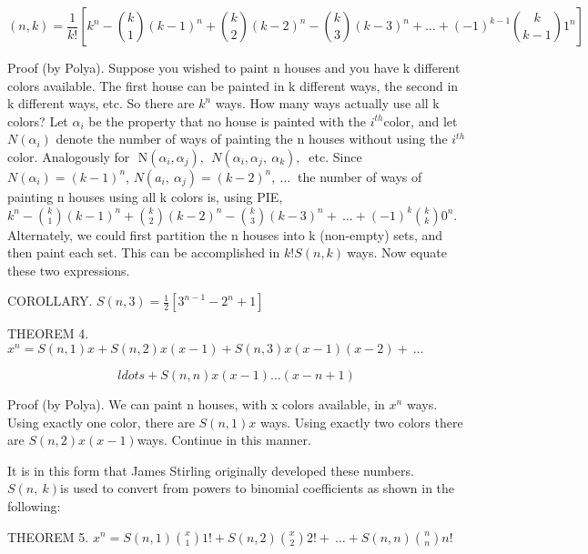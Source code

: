 \[
\left( n,k \right) = \frac{1}{k!}\left\lbrack k^{n} - \binom{k}{1} \left( k - 1 \right)^{n} + \binom{k}{2} \left( k - 2 \right)^{n} - \binom{k}{3} \left( k - 3 \right)^{n} + \ldots + \left( - 1 \right)^{k - 1}\binom{k}{k - 1} 1^{n} \right\rbrack
\]

Proof (by Polya). Suppose you wished to paint n houses and you have k
different colors available. The first house can be painted in k
different ways, the second in k different ways, etc. So there are
\(k^{n}\) ways. How many ways actually use all k colors? Let
\(\alpha_{i}\) be the property that no house is painted with the
\(i^{th}\)color, and let \(N(\alpha_{i})\) denote the number of ways of
painting the n houses without using the \(i^{th}\)color. Analogously for
\(\text{\ N}\left( \alpha_{i},\alpha_{j} \right),\ \ N\left( \alpha_{i},\alpha_{j},\ \alpha_{k} \right),\ \)
etc. Since \(N\left( \alpha_{i} \right) = \left( k - 1 \right)^{n}\),
\(N\left( a_{i},\ \alpha_{j} \right) = \left( k - 2 \right)^{n},\ \ldots\ \)
the number of ways of painting n houses using all k colors is, using
PIE, \(k^{n} -\binom{k}{1}
\left( k - 1 \right)^{n} +
\binom{k}{2}
\left( k - 2 \right)^{n} -
\binom{k}{3}
\left( k - 3 \right)^{n} + \ \ldots + \left( - 1 \right)^{k}
\binom{k}{k}
0^{n}\). Alternately, we could first partition the n houses
into k (non-empty) sets, and then paint each set. This can be
accomplished in \(k!S\left( n,k \right)\ \)ways. Now equate these two
expressions.

COROLLARY.
\(S\left( n,3 \right) = \frac{1}{2}\left\lbrack 3^{n - 1} - 2^{n} + 1 \right\rbrack\)

THEOREM 4.
\(x^{n} = S\left( n,1 \right)x + S\left( n,2 \right)x\left( x - 1 \right) + S\left( n,3 \right)x\left( x - 1 \right)\left( x - 2 \right) + \ \ldots\ \)

\[
ldots + S\left( n,n \right)x\left( x - 1 \right)\ldots(x - n + 1)
\]

Proof (by Polya). We can paint n houses, with x colors available, in
\(x^{n}\) ways. Using exactly one color, there are
\(S\left( n,1 \right)x\) ways. Using exactly two colors there are
\(S\left( n,2 \right)x(x - 1)\)ways. Continue in this manner.

It is in this form that James Stirling originally developed these
numbers. \(S(n,\ k)\)is used to convert from powers to binomial
coefficients as shown in the following:

THEOREM 5. \(x^{n} = S\left( n,1 \right)
\binom{x}{1}
1! + S\left( n,2 \right)
\binom{x}{2}
2! + \ \ldots + S\left( n,n \right)
\binom{n}{n}
n!\ \)

